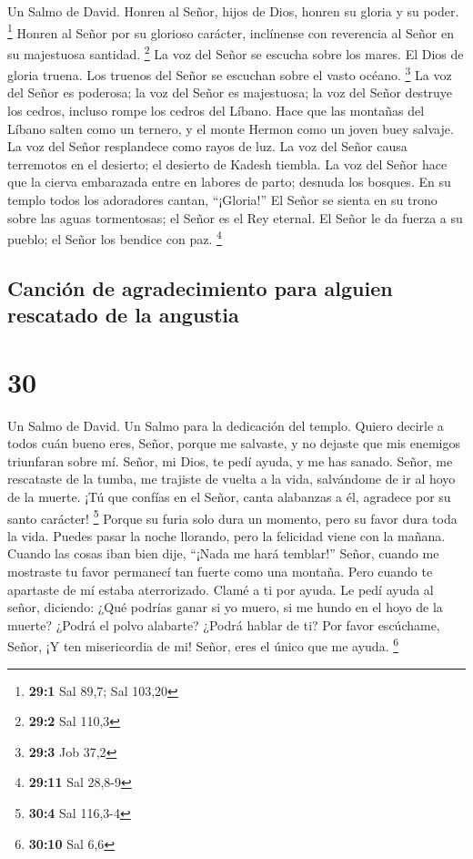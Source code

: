 Un Salmo de David.  Honren al Señor, hijos de Dios, honren
su gloria y su poder. \footnote{\textbf{29:1} Sal 89,7; Sal 103,20}
 Honren al Señor por su glorioso carácter, inclínense con
reverencia al Señor en su majestuosa santidad. \footnote{\textbf{29:2}
  Sal 110,3}  La voz del Señor se escucha sobre los mares.
El Dios de gloria truena. Los truenos del Señor se escuchan sobre el
vasto océano. \footnote{\textbf{29:3} Job 37,2}  La voz del
Señor es poderosa; la voz del Señor es majestuosa;  la voz
del Señor destruye los cedros, incluso rompe los cedros del Líbano.
 Hace que las montañas del Líbano salten como un ternero, y
el monte Hermon como un joven buey salvaje.  La voz del
Señor resplandece como rayos de luz.  La voz del Señor causa
terremotos en el desierto; el desierto de Kadesh tiembla. 
La voz del Señor hace que la cierva embarazada entre en labores de
parto; desnuda los bosques. En su templo todos los adoradores cantan,
``¡Gloria!''  El Señor se sienta en su trono sobre las
aguas tormentosas; el Señor es el Rey eternal.  El Señor le
da fuerza a su pueblo; el Señor los bendice con paz. \footnote{\textbf{29:11}
  Sal 28,8-9}

\hypertarget{canciuxf3n-de-agradecimiento-para-alguien-rescatado-de-la-angustia}{%
\subsection{Canción de agradecimiento para alguien rescatado de la
angustia}\label{canciuxf3n-de-agradecimiento-para-alguien-rescatado-de-la-angustia}}

\hypertarget{section-29}{%
\section{30}\label{section-29}}

Un Salmo de David. Un Salmo para la dedicación del templo. 
Quiero decirle a todos cuán bueno eres, Señor, porque me salvaste, y no
dejaste que mis enemigos triunfaran sobre mí.  Señor, mi
Dios, te pedí ayuda, y me has sanado.  Señor, me rescataste
de la tumba, me trajiste de vuelta a la vida, salvándome de ir al hoyo
de la muerte.  ¡Tú que confías en el Señor, canta alabanzas
a él, agradece por su santo carácter! \footnote{\textbf{30:4} Sal
  116,3-4}  Porque su furia solo dura un momento, pero su
favor dura toda la vida. Puedes pasar la noche llorando, pero la
felicidad viene con la mañana.  Cuando las cosas iban bien
dije, ``¡Nada me hará temblar!''  Señor, cuando me mostraste
tu favor permanecí tan fuerte como una montaña. Pero cuando te apartaste
de mí estaba aterrorizado.  Clamé a ti por ayuda. Le pedí
ayuda al señor, diciendo:  ¿Qué podrías ganar si yo muero,
si me hundo en el hoyo de la muerte? ¿Podrá el polvo alabarte? ¿Podrá
hablar de ti?  Por favor escúchame, Señor, ¡Y ten
misericordia de mi! Señor, eres el único que me ayuda. \footnote{\textbf{30:10}
  Sal 6,6}

